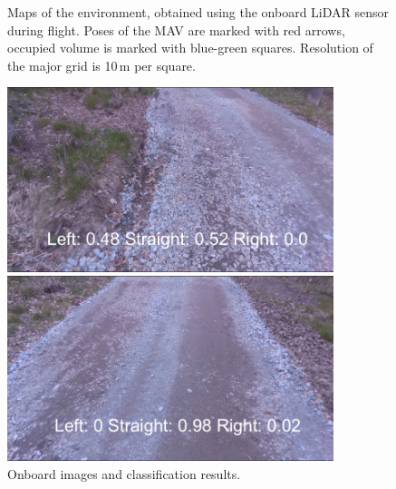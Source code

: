 \begin{figure}[!h]
  \centering	

  \caption{Maps of the environment, obtained using the onboard \acs{LiDAR} sensor during flight. Poses of the \acs{MAV} are marked with red arrows, occupied volume is marked with blue-green squares. Resolution of the major grid is 10\,m per square.}
  \label{fig:lidar}
\end{figure}
\begin{figure}[!h]
  \begin{minipage}{.5\linewidth}
  \centering
  \includegraphics[width=0.85\textwidth]{./fig/photos/path3_camera.png}
  
  \end{minipage}
  \begin{minipage}{.5\linewidth}
  \centering	
  \includegraphics[width=0.85\textwidth]{./fig/photos/path3_camera2.png}
  
  \end{minipage}
  \caption{Onboard images and classification results.}
  \label{fig:onboard}
\end{figure}






